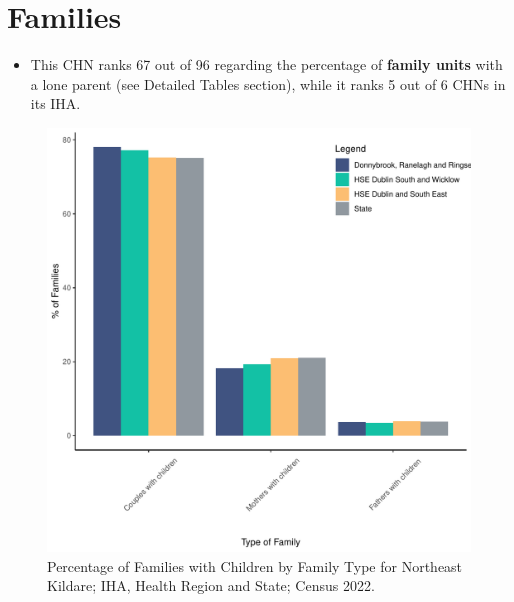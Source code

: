 \documentclass{article}
\begin{document}
\section{Families}\label{sect:Fam}
\begin{itemize}
\item This CHN ranks  67 out of 96 regarding the percentage of \textbf{family units} with a lone parent (see Detailed Tables section), while it ranks   5 out of 6 CHNs in its IHA.
\end{itemize}
\begin{figure}[H]
	\centering
	\includegraphics[width = 150mm]{../figures/FamED.pdf}
	\caption{Percentage of Families with Children by Family Type for Northeast Kildare; IHA, Health Region and State; Census 2022.}
	\label{fig:vbnv}
	\end{figure}
	
\end{document}
